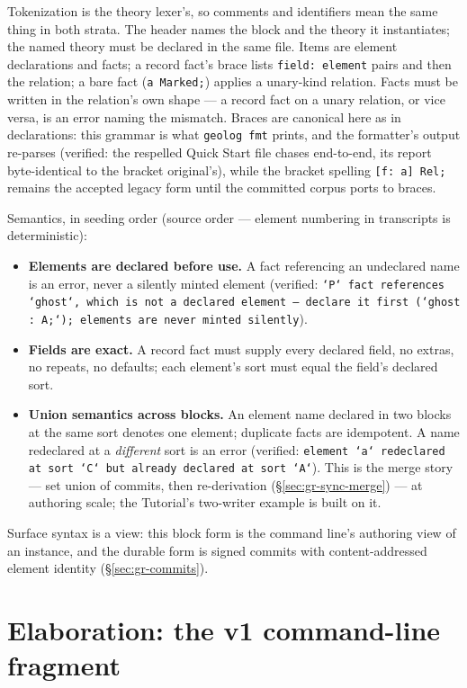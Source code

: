 \noindent Tokenization is the theory lexer's, so comments and
identifiers mean the same thing in both strata. The header names the
block and the theory it instantiates; the named theory must be
declared in the same file. Items are element declarations and facts;
a record fact's brace lists \texttt{field: element} pairs and then
the relation; a bare fact (\texttt{a Marked;}) applies a unary-kind
relation. Facts must be written in the relation's own shape — a
record fact on a unary relation, or vice versa, is an error naming
the mismatch. Braces are canonical here as in declarations: this
grammar is what \texttt{geolog fmt} prints, and the formatter's
output re-parses (verified: the respelled Quick Start file chases
end-to-end, its report byte-identical to the bracket original's),
while the bracket spelling \texttt{[f:\,a]\,Rel;} remains the
accepted legacy form until the committed corpus ports to braces.

Semantics, in seeding order (source order — element numbering in
transcripts is deterministic):

\begin{itemize}
\item \textbf{Elements are declared before use.} A fact referencing
an undeclared name is an error, never a silently minted element
(verified: \texttt{`P` fact references `ghost`, which is not a
declared element — declare it first (`ghost : A;`); elements are
never minted silently}).
\item \textbf{Fields are exact.} A record fact must supply every
declared field, no extras, no repeats, no defaults; each element's
sort must equal the field's declared sort.
\item \textbf{Union semantics across blocks.} An element name
declared in two blocks at the same sort denotes one element;
duplicate facts are idempotent. A name redeclared at a
\emph{different} sort is an error (verified: \texttt{element `a`
redeclared at sort `C` but already declared at sort `A`}). This is
the merge story — set union of commits, then re-derivation
(\S\ref{sec:gr-sync-merge}) — at authoring scale; the Tutorial's
two-writer example is built on it.
\end{itemize}

\noindent Surface syntax is a view: this block form is the command
line's authoring view of an instance, and the durable form is signed
commits with content-addressed element identity
(\S\ref{sec:gr-commits}).

\section{Elaboration: the v1 command-line fragment}
\label{sec:gr-elab}

